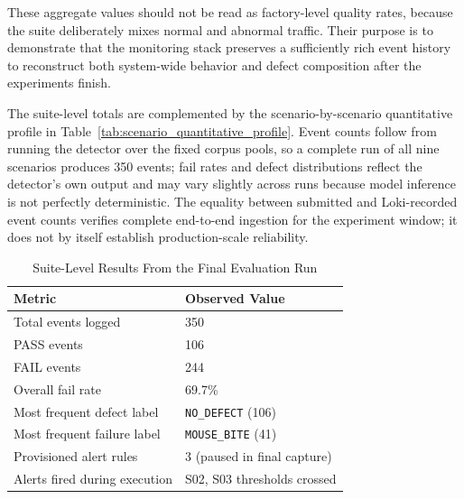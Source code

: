\documentclass[12pt,a4paper]{article}
\begin{document}
These aggregate values should not be read as factory-level quality rates,
because the suite deliberately mixes normal and abnormal traffic. Their purpose
is to demonstrate that the monitoring stack preserves a sufficiently rich event
history to reconstruct both system-wide behavior and defect composition after
the experiments finish.

The suite-level totals are complemented by the scenario-by-scenario quantitative
profile in Table~\ref{tab:scenario_quantitative_profile}. Event counts follow
from running the detector over the fixed corpus pools, so a complete run of all
nine scenarios produces 350 events; fail rates and defect distributions reflect
the detector's own output and may vary slightly across runs because model
inference is not perfectly deterministic. The equality between submitted and
Loki-recorded event counts verifies complete end-to-end ingestion for the
experiment window; it does not by itself establish production-scale reliability.

\begin{table}[!ht]
\centering
\caption{Suite-Level Results From the Final Evaluation Run}
\label{tab:overall_results}
\begin{tabular}{p{} p{}}
\toprule
\textbf{Metric} & \textbf{Observed Value} \\
\midrule
Total events logged & 350 \\
PASS events & 106 \\
FAIL events & 244 \\
Overall fail rate & 69.7\% \\
Most frequent defect label & \texttt{NO\_DEFECT} (106) \\
Most frequent failure label & \texttt{MOUSE\_BITE} (41) \\
Provisioned alert rules & 3 (paused in final capture) \\
Alerts fired during execution & S02, S03 thresholds crossed \\
\bottomrule
\end{tabular}
\end{table}
\end{document}
